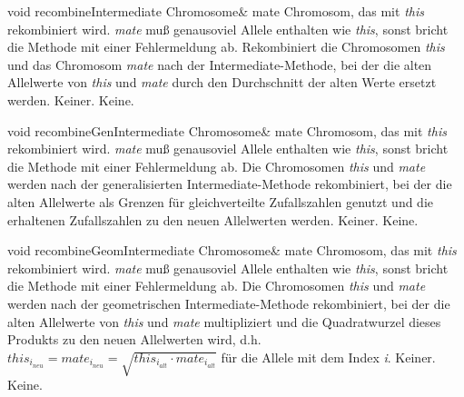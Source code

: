 \documentclass{report}
\begin{document}
\newpage

\setNormalInstance
\printMethodWithOneParam
{void}
{recombineIntermediate}
{Chromosome\&}
{mate}
{Chromosom, das mit {\em this} rekombiniert wird. {\em mate} mu{\ss}
                           genausoviel Allele enthalten wie {\em this},
sonst bricht die Methode mit einer Fehlermeldung ab.}
{Rekombiniert die Chromosomen {\em this} und das Chromosom {\em mate} nach der 
    Inter\-me\-di\-ate-Methode, bei der die alten Allelwerte von {\em this} und {\em mate}
    durch den Durchschnitt der alten Werte ersetzt werden.}
{Keiner.}
{Keine.}

\vspace{4ex}

\setNormalInstance
\printMethodWithOneParam
{void}
{recombineGenIntermediate}
{Chromosome\&}
{mate}
{Chromosom, das mit {\em this} rekombiniert wird. {\em mate} mu{\ss}
                           genausoviel Allele enthalten wie {\em this}, sonst
bricht die Methode mit einer  Fehlermeldung ab.}
{Die Chromosomen {\em this} und {\em mate} werden nach der generalisierten 
    Intermediate-Methode rekombiniert, bei der die alten Allelwerte
    als Grenzen f\"ur gleichverteilte Zufallszahlen genutzt und die
    erhaltenen Zufallszahlen zu den neuen Allelwerten werden.}
{Keiner.}
{Keine.}

\vspace{4ex}

\setNormalInstance
\printMethodWithOneParam
{void}
{recombineGeomIntermediate}
{Chromosome\&}
{mate}
{Chromosom, das mit {\em this} rekombiniert wird. {\em mate} mu{\ss}
                           genausoviel Allele enthalten wie {\em this},
sonst bricht die Methode mit einer Fehlermeldung ab.}
{Die Chromosomen {\em this} und {\em mate} werden nach der geometrischen 
    Intermediate-Methode rekombiniert, bei der die alten Allelwerte
    von {\em this} und {\em mate} multipliziert und die Quadratwurzel dieses
    Produkts zu den neuen Allelwerten wird, d.h. 
    $this_{i_{neu}} = mate_{i_{neu}} = \sqrt{this_{i_{alt}} \cdot 
    mate_{i_{alt}}}$ 
    f\"ur
    die Allele mit dem Index {\em i}.}
{Keiner.}
{Keine.}
\end{document}
